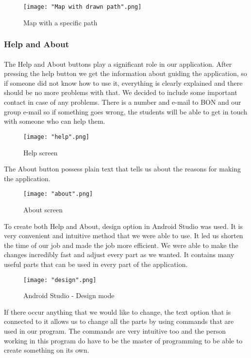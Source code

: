 \documentclass[12pt]{article}
\begin{document}
\begin{figure}[H]
\centerline{\texttt{[image: "Map with drawn path".png]}}
\caption{Map with a specific path}
\label{fig:MapPath}
\end{figure}
 
\subsubsection{Help and About}
\paragraph{}
The Help and About buttons play a significant role in our application. After pressing the help button we get the information about guiding the application, so if someone did not know how to use it, everything is clearly explained and there should be no more problems with that. We decided to include some important contact in case of any problems. There is a number and e-mail to BON and our group e-mail so if something goes wrong, the students will be able to get in touch with someone who can help them.

\begin{figure}[H]
\centerline{\texttt{[image: "help".png]}}
\caption{Help screen}
\label{fig:help}
\end{figure}

The About button possess plain text that tells us about the reasons for making the application. 

\begin{figure}[H]
\centerline{\texttt{[image: "about".png]}}
\caption{About screen}
\label{fig:about}
\end{figure}

To create both Help and About, design option in Android Studio was used. It is very convenient and intuitive method that we were able to use. It led us shorten the time of our job and made the job more efficient. We were able to make the changes incredibly fast and adjust every part as we wanted. It contains many useful parts that can be used in every part of the application. 

\begin{figure}[H]
\centerline{\texttt{[image: "design".png]}}
\caption{Android Studio - Design mode}
\label{fig:design}
\end{figure}

If there occur anything that we would like to change, the text option that is connected to it allows us to change all the parts by using commands that are used in our program. The commands are very intuitive too and the person working in this program do have to be the master of programming to be able to create something on its own. 
\end{document}
